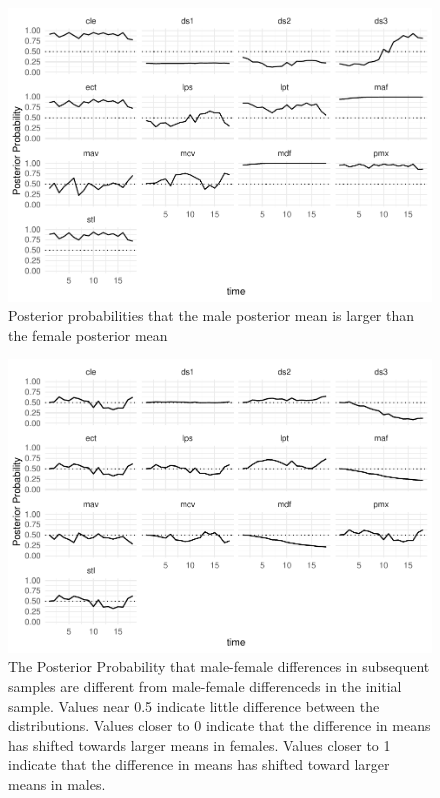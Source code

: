 \documentclass[
  12pt,
]{article}
\begin{document}
\begin{figure}

{\centering \includegraphics{paper_files/figure-latex/prob0-plot-1} 

}

\caption{Posterior probabilities that the male posterior mean is larger than the female posterior mean}\label{fig:prob0-plot}
\end{figure}

\begin{figure}

{\centering \includegraphics{paper_files/figure-latex/AUC-plot-1} 

}

\caption{The Posterior Probability that male-female differences in subsequent samples are different from male-female differenceds in the initial sample. Values near 0.5 indicate little difference between the distributions. Values closer to 0 indicate that the difference in means has shifted towards larger means in females. Values closer to 1 indicate that the difference in means has shifted toward larger means in males.}\label{fig:AUC-plot}
\end{figure}
\end{document}
